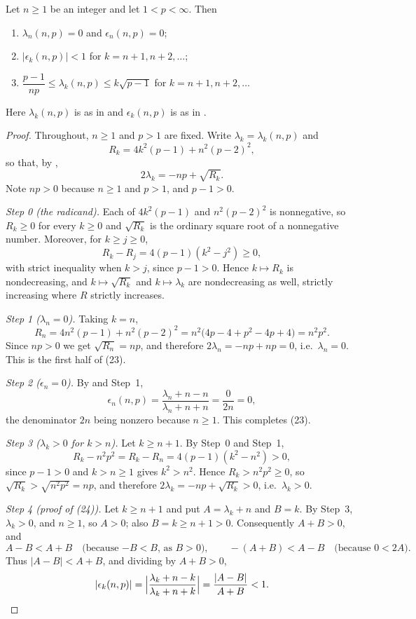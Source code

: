 \begin{lemma}
Let $n\ge1$ be an integer and let $1<p<\infty$.  Then
\begin{enumerate}
\item[(23)] $\lambda_n(n,p)=0$ and $\epsilon_n(n,p)=0$;
\item[(24)] $|\epsilon_k(n,p)|<1$ for $k=n+1,n+2,\dots$;
\item[(25)] $\dfrac{p-1}{np}\le\lambda_k(n,p)\le k\sqrt{p-1}$ for
$k=n+1,n+2,\dots$
\end{enumerate}
Here $\lambda_k(n,p)$ is as in  and $\epsilon_k(n,p)$ is
as in .
\end{lemma}
\begin{proof}
Throughout, $n\ge1$ and $p>1$ are fixed.  Write $\lambda_k=\lambda_k(n,p)$ and
\[
  R_k=4k^2(p-1)+n^2(p-2)^2,
\]
so that, by ,
\[
  2\lambda_k=-np+\sqrt{R_k}.
\]
Note $np>0$ because $n\ge1$ and $p>1$, and $p-1>0$.

\emph{Step 0 (the radicand).}  Each of $4k^2(p-1)$ and $n^2(p-2)^2$ is
nonnegative, so $R_k\ge0$ for every $k\ge0$ and $\sqrt{R_k}$ is the ordinary
square root of a nonnegative number.  Moreover, for $k\ge j\ge0$,
\[
  R_k-R_j=4(p-1)(k^2-j^2)\ge0,
\]
with strict inequality when $k>j$, since $p-1>0$.  Hence $k\mapsto R_k$ is
nondecreasing, and $k\mapsto\sqrt{R_k}$ and $k\mapsto\lambda_k$ are
nondecreasing as well, strictly increasing where $R$ strictly increases.

\emph{Step 1 ($\lambda_n=0$).}  Taking $k=n$,
\[
  R_n=4n^2(p-1)+n^2(p-2)^2=n^2\bigl(4p-4+p^2-4p+4\bigr)=n^2p^2 .
\]
Since $np>0$ we get $\sqrt{R_n}=np$, and therefore
$2\lambda_n=-np+np=0$, i.e.\ $\lambda_n=0$.  This is the first half of (23).

\emph{Step 2 ($\epsilon_n=0$).}  By  and Step~1,
\[
  \epsilon_n(n,p)=\frac{\lambda_n+n-n}{\lambda_n+n+n}=\frac{0}{2n}=0,
\]
the denominator $2n$ being nonzero because $n\ge1$.  This completes (23).

\emph{Step 3 ($\lambda_k>0$ for $k>n$).}  Let $k\ge n+1$.  By Step~0 and
Step~1,
\[
  R_k-n^2p^2=R_k-R_n=4(p-1)(k^2-n^2)>0,
\]
since $p-1>0$ and $k>n\ge1$ gives $k^2>n^2$.  Hence $R_k>n^2p^2\ge0$, so
$\sqrt{R_k}>\sqrt{n^2p^2}=np$, and therefore $2\lambda_k=-np+\sqrt{R_k}>0$,
i.e.\ $\lambda_k>0$.

\emph{Step 4 (proof of (24)).}  Let $k\ge n+1$ and put
$A=\lambda_k+n$ and $B=k$.  By Step~3, $\lambda_k>0$, and $n\ge1$, so $A>0$;
also $B=k\ge n+1>0$.  Consequently $A+B>0$, and
\[
  A-B<A+B\quad\text{(because $-B<B$, as $B>0$)},\qquad
  -(A+B)<A-B\quad\text{(because $0<2A$)} .
\]
Thus $|A-B|<A+B$, and dividing by $A+B>0$,
\[
  |\epsilon_k(n,p)|=\Bigl|\frac{\lambda_k+n-k}{\lambda_k+n+k}\Bigr|
  =\frac{|A-B|}{A+B}<1 .
\]


\end{proof}
